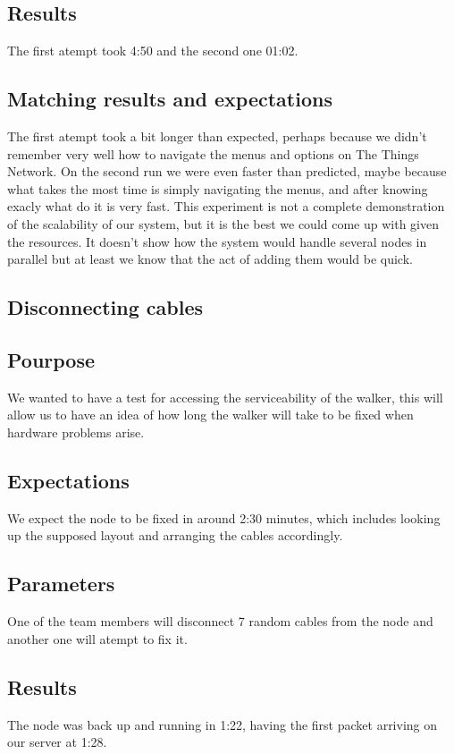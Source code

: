 	\subsection{Results}
		The first atempt took 4:50 and the second one 01:02.
	\subsection{Matching results and expectations}
		The first atempt took a bit longer than expected, perhaps because we didn't remember very well how to navigate the menus and options on The Things Network. On the second run we were even faster than predicted, maybe because what takes the most time is simply navigating the menus, and after knowing exacly what do it is very fast. This experiment is not a complete demonstration of the scalability of our system, but it is the best we could come up with given the resources. It doesn't show how the system would handle several nodes in parallel but at least we know that the act of adding them would be quick.

\subsection{Disconnecting cables}

	\subsection{Pourpose}
		We wanted to have a test for accessing the serviceability of the walker, this will allow us to have an idea of how long the walker will take to be fixed when hardware problems arise.
	\subsection{Expectations}
		We expect the node to be fixed in around 2:30 minutes, which includes looking up the supposed layout and arranging the cables accordingly.
	\subsection{Parameters}
		One of the team members will disconnect 7 random cables from the node and another one will atempt to fix it.
	\subsection{Results}
		The node was back up and running in 1:22, having the first packet arriving on our server at 1:28.

